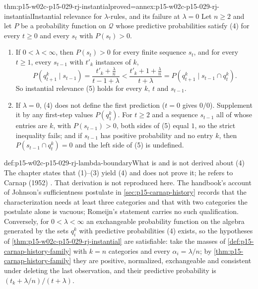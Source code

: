 \begin{hbtheorem}{thm:p15-w02c-p15-029-rj-instantial}{proved=annex:p15-w02c-p15-029-rj-instantial}{Instantial relevance for \texorpdfstring{\(\lambda\)}{lambda}-rules, and its failure at \texorpdfstring{\(\lambda=0\)}{lambda = 0}}
Let \(n\ge2\) and let \(P\) be a probability function on \(\mathcal Q\)
whose predictive probabilities satisfy (4) for every \(t\ge0\) and every
\(s_t\) with \(P(s_t)>0\).
\begin{enumerate}
\item If \(0<\lambda<\infty\), then \(P(s_t)>0\) for every finite
  sequence \(s_t\), and for every \(t\ge1\), every \(s_{t-1}\) with
  \(t'_k\) instances of \(k\),
  \[
   P(q^k_{t+1}\mid s_{t-1})=\frac{t'_k+\frac{\lambda}{n}}{t-1+\lambda}
   <\frac{t'_k+1+\frac{\lambda}{n}}{t+\lambda}
   =P(q^k_{t+1}\mid s_{t-1}\cap q^k_t).
  \]
  So instantial relevance (5) holds for every \(k\), \(t\) and
  \(s_{t-1}\).
\item If \(\lambda=0\), (4) does not define the first prediction
  (\(t=0\) gives \(0/0\)). Supplement it by any first-step values
  \(P(q^k_1)\). For \(t\ge2\) and a sequence \(s_{t-1}\) all of whose
  entries are \(k\), with \(P(s_{t-1})>0\), both sides of (5) equal
  \(1\), so the strict inequality fails; and if \(s_{t-1}\) has
  positive probability and no entry \(k\), then
  \(P(s_{t-1}\cap q^k_t)=0\) and the left side of (5) is undefined.
\end{enumerate}
\end{hbtheorem}

\begin{proofboundary}{def:p15-w02c-p15-029-rj-lambda-boundary}{What is and is not derived about (4)}
The chapter states that (1)--(3) yield (4) and does not prove it; he
refers to Carnap (1952) \cite[p.~631]{Romeijn2011InductiveLogicStatistics}.
That derivation is not reproduced here. The handbook's account of
Johnson's sufficientness postulate in \cref{sec:p15-carnap-history}
records that the characterization needs at least three categories and
that with two categories the postulate alone is vacuous; Romeijn's
statement carries no such qualification. Conversely, for
\(0<\lambda<\infty\) an exchangeable probability function on the
algebra generated by the sets \(q^k_i\) with predictive probabilities
(4) exists, so the hypotheses of
\cref{thm:p15-w02c-p15-029-rj-instantial} are satisfiable: take the
masses of \cref{def:p15-carnap-history-family} with \(k=n\) categories
and every \(\alpha_i=\lambda/n\); by
\cref{thm:p15-carnap-history-family} they are positive, normalized,
exchangeable and consistent under deleting the last observation, and
their predictive probability is \((t_k+\lambda/n)/(t+\lambda)\).
\end{proofboundary}

